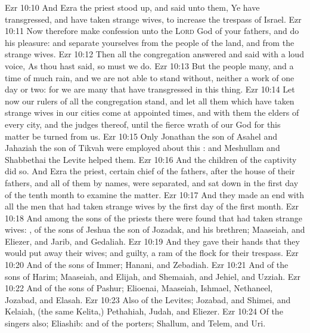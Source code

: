 \vs Ezr 10:10 And Ezra the priest stood up, and said unto them, Ye have transgressed, and have taken strange wives, to increase the trespass of Israel.
\vs Ezr 10:11 Now therefore make confession unto the \textsc{Lord} God of your fathers, and do his pleasure: and separate yourselves from the people of the land, and from the strange wives.
\vs Ezr 10:12 Then all the congregation answered and said with a loud voice, As thou hast said, so must we do.
\vs Ezr 10:13 But the people  many, and  a time of much rain, and we are not able to stand without, neither  a work of one day or two: for we are many that have transgressed in this thing.
\vs Ezr 10:14 Let now our rulers of all the congregation stand, and let all them which have taken strange wives in our cities come at appointed times, and with them the elders of every city, and the judges thereof, until the fierce wrath of our God for this matter be turned from us.
\vs Ezr 10:15 Only Jonathan the son of Asahel and Jahaziah the son of Tikvah were employed about this : and Meshullam and Shabbethai the Levite helped them.
\vs Ezr 10:16 And the children of the captivity did so. And Ezra the priest,  certain chief of the fathers, after the house of their fathers, and all of them by  names, were separated, and sat down in the first day of the tenth month to examine the matter.
\vs Ezr 10:17 And they made an end with all the men that had taken strange wives by the first day of the first month.
\vs Ezr 10:18 And among the sons of the priests there were found that had taken strange wives: , of the sons of Jeshua the son of Jozadak, and his brethren; Maaseiah, and Eliezer, and Jarib, and Gedaliah.
\vs Ezr 10:19 And they gave their hands that they would put away their wives; and  guilty,  a ram of the flock for their trespass.
\vs Ezr 10:20 And of the sons of Immer; Hanani, and Zebadiah.
\vs Ezr 10:21 And of the sons of Harim; Maaseiah, and Elijah, and Shemaiah, and Jehiel, and Uzziah.
\vs Ezr 10:22 And of the sons of Pashur; Elioenai, Maaseiah, Ishmael, Nethaneel, Jozabad, and Elasah.
\vs Ezr 10:23 Also of the Levites; Jozabad, and Shimei, and Kelaiah, (the same  Kelita,) Pethahiah, Judah, and Eliezer.
\vs Ezr 10:24 Of the singers also; Eliashib: and of the porters; Shallum, and Telem, and Uri.
